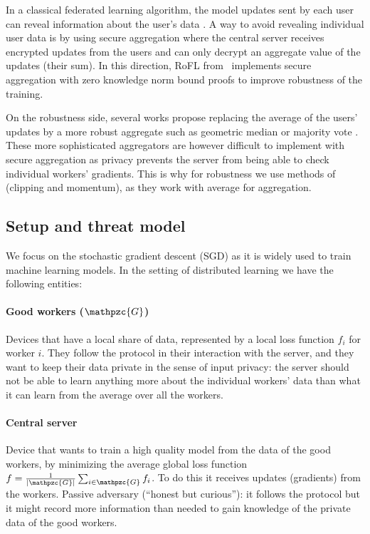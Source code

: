 \documentclass{article}
\newcommand{\gset}{\ensuremath{{\mathpzc{G}}}}
\begin{document}
In a classical federated learning algorithm, the model updates sent by each user can reveal information about the user's data \parencite{FeatureLeakage}. A way to avoid revealing individual user data is by using secure aggregation \parencite{SecureAggregation} where the central server receives encrypted updates from the users and can only decrypt an aggregate value of the updates (their sum). In this direction, RoFL from~\cite{Rofl} implements secure aggregation with zero knowledge norm bound proofs to improve robustness of the training.

On the robustness side, several works propose replacing the average of the users' updates by a more robust aggregate such as geometric median \parencite{DistributedRobustLearning} or majority vote \parencite{SignSGDMajorityVote}. These more sophisticated aggregators are however difficult to implement with secure aggregation as privacy prevents the server from being able to check individual workers' gradients. This is why for robustness we use methods of \cite{LearningFromHistory} (clipping and momentum), as they work with average for aggregation.


\subsection{Setup and threat model}


We focus on the stochastic gradient descent (SGD) as it is widely used to train machine learning models. In the setting of distributed learning we have the following entities:


\paragraph*{Good workers ($\gset$)} Devices that have a local share of data, represented by a local loss function $f_i$ for worker $i$. They follow the protocol in their interaction with the server, and they want to keep their data private in the sense of input privacy: the server should not be able to learn anything more about the individual workers' data than what it can learn from the average over all the workers.

\paragraph*{Central server} Device that wants to train a high quality model from the data of the good workers, by minimizing the average global loss function $f = \tfrac{1}{|\gset|} \tsum_{i\in\gset} f_i$. To do this it receives updates (gradients) from the workers. Passive adversary (``honest but curious''): it follows the protocol but it might record more information than needed to gain knowledge of the private data of the good workers. 
\end{document}
